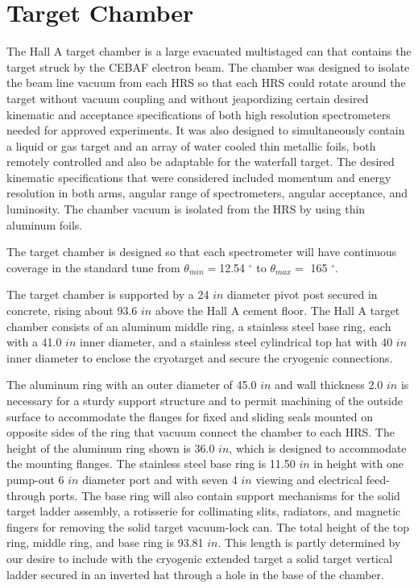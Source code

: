 \section{Target Chamber}

	The Hall A target chamber  is a large  evacuated  multistaged can that
contains the target struck by the CEBAF electron beam. The
chamber was designed to isolate the beam line vacuum from  each
HRS so that each HRS could rotate
around the target without vacuum coupling and without jeapordizing
certain desired kinematic and acceptance  specifications of 
both high resolution spectrometers
needed for approved experiments.  It  was also designed to simultaneously
 contain a liquid or gas target and an array of water cooled thin
 metallic foils, both remotely controlled and also be adaptable for
the waterfall target. The desired kinematic specifications that were
 considered included momentum and energy resolution in both arms,
 angular range of spectrometers, angular acceptance, and luminosity.
The chamber vacuum is isolated from the  HRS by using thin aluminum foils. 

The target chamber is designed so that
each spectrometer will have continuous coverage in the standard tune from
$\theta_{min}=$12.54 $^\circ$ to $\theta_{max}=$ 165 $^\circ$.

The target chamber is supported by a 24 $in$ diameter pivot post
secured in concrete, rising about 93.6 $in$ above the Hall A cement floor.
The Hall A target chamber
consists of an aluminum middle ring, a stainless steel base ring,
each with a 41.0 $in$ inner diameter,
and a stainless steel cylindrical top hat with 40 $in$ inner diameter
to enclose the cryotarget and secure the cryogenic connections.

	The aluminum ring with an outer diameter of 45.0 $in$ and
wall thickness 2.0 $in$  is necessary for a sturdy support structure and
to permit machining of the outside surface to accommodate
the flanges for fixed and sliding seals mounted on
opposite sides of the ring that vacuum connect the chamber to each HRS.
The height of the aluminum ring shown is 36.0 $in$, which is
designed to accommodate the mounting flanges.
The stainless steel base ring 
is 11.50 $in$ in height with
one pump-out 6 $in$ diameter port  and with
seven 4 $in$ viewing and electrical feed-through ports.
The base ring will also contain support mechanisms for the solid
target ladder assembly, a rotisserie for collimating slits, radiators, and
magnetic
fingers for
removing the solid target vacuum-lock can. The total height of the top
ring, middle ring, and
base ring is 93.81 $in$. This length is partly determined by our desire to
include with the cryogenic extended target a solid target vertical ladder
secured in an inverted hat through a hole in the base of the chamber.

